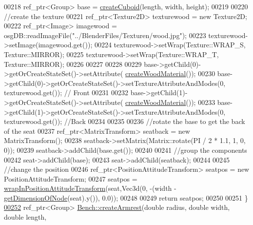 \begin{DoxyCode}
00218         ref\_ptr<Group> base = \hyperlink{namespacebrtr_ae7f155c263aec9663a02763ed0bb882b}{createCuboid}(length, width, height);
00219       
00220          \textcolor{comment}{//create the texture}
00221         ref\_ptr<Texture2D> texturewood = \textcolor{keyword}{new} Texture2D;
00222         ref\_ptr<Image> imagewood = osgDB::readImageFile(\textcolor{stringliteral}{"../BlenderFiles/Texturen/wood.jpg"});       
00223         texturewood->setImage(imagewood.get());
00224         texturewood->setWrap(Texture::WRAP\_S, Texture::MIRROR);
00225         texturewood->setWrap(Texture::WRAP\_T, Texture::MIRROR);
00226 
00227 
00228         
00229         base->getChild(0)->getOrCreateStateSet()->setAttribute(
      \hyperlink{classbrtr_1_1_bench_a57d6d3f038d3f0e8d5f8b83895a6670a}{createWoodMaterial}());
00230         base->getChild(0)->getOrCreateStateSet()->setTextureAttributeAndModes(0, texturewood.get()); \textcolor{comment}{//
      Front}
00231 
00232         base->getChild(1)->getOrCreateStateSet()->setAttribute(
      \hyperlink{classbrtr_1_1_bench_a57d6d3f038d3f0e8d5f8b83895a6670a}{createWoodMaterial}());                
00233         base->getChild(1)->getOrCreateStateSet()->setTextureAttributeAndModes(0, texturewood.get()); \textcolor{comment}{//Back}
00234         
00235         
00236         \textcolor{comment}{//rotate the base to get the back of the seat}
00237         ref\_ptr<MatrixTransform> seatback = \textcolor{keyword}{new} MatrixTransform();
00238         seatback->setMatrix(Matrix::rotate(PI / 2 * 1.1, 1, 0, 0));
00239         seatback->addChild(base.get());
00240 
00241         \textcolor{comment}{//group the components}
00242         seat->addChild(base);
00243         seat->addChild(seatback);
00244 
00245         \textcolor{comment}{//change the position}
00246         ref\_ptr<PositionAttitudeTransform> seatpos = \textcolor{keyword}{new} PositionAttitudeTransform;
00247         seatpos = \hyperlink{namespacebrtr_a887d7975f37c4334b70e2196735b6678}{wrapInPositionAttitudeTransform}(seat,Vec3d(0, -(width - 
      \hyperlink{namespacebrtr_a24ba7c5d07ad50afb09990116dd3556d}{getDimensionOfNode}(seat).y()), 0.0));
00248 
00249         \textcolor{keywordflow}{return} seatpos;
00250 
00251     \}
\hypertarget{_bench_8cpp_source_l00252}{}\hyperlink{classbrtr_1_1_bench_a9956994e6a20cbbd0f0ce9eb6df25917}{00252}     ref\_ptr<Group> \hyperlink{classbrtr_1_1_bench_a9956994e6a20cbbd0f0ce9eb6df25917}{Bench::createArmrest}(\textcolor{keywordtype}{double} radius, \textcolor{keywordtype}{double} width, \textcolor{keywordtype}{double} length, \textcolor{keywordtype}{
}
\end{DoxyCode}
